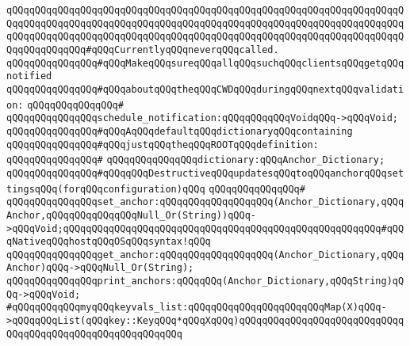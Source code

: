 \verb|qQQqqQQqqQQqqQQqqQQqqQQqqQQqqQQqqQQqqQQqqQQqqQQqqQQqqQQqqQQqqQQqqQQqqQQqqQQqqQQqqQQqqQQqqQQqqQQqqQQqqQQqqQQqqQQqqQQqqQQqqQQqqQQqqQQqqQQqqQQqqQQqqQQqqQQqqQQqqQQqqQQqqQQqqQQqqQQqqQQqqQQqqQQqqQQqqQQqqQQqqQQqqQQqqQQqqQQqqQQqqQQq#qQQqCurrentlyqQQqneverqQQqcalled.|\newline
\newline
\verb|qQQqqQQqqQQqqQQq#qQQqMakeqQQqsureqQQqallqQQqsuchqQQqclientsqQQqgetqQQqnotified|\newline
\verb|qQQqqQQqqQQqqQQq#qQQqaboutqQQqtheqQQqCWDqQQqduringqQQqnextqQQqvalidation:|\newline
\verb|qQQqqQQqqQQqqQQq#|\newline
\verb|qQQqqQQqqQQqqQQqschedule_notification:qQQqqQQqqQQqVoidqQQq->qQQqVoid;|\newline
\newline
\newline
\verb|qQQqqQQqqQQqqQQq#qQQqAqQQqdefaultqQQqdictionaryqQQqcontaining|\newline
\verb|qQQqqQQqqQQqqQQq#qQQqjustqQQqtheqQQqROOTqQQqdefinition:|\newline
\verb|qQQqqQQqqQQqqQQq#|\newline
\verb|qQQqqQQqqQQqqQQqdictionary:qQQqAnchor_Dictionary;|\newline
\newline
\newline
\verb|qQQqqQQqqQQqqQQq#qQQqqQQqDestructiveqQQqupdatesqQQqtoqQQqanchorqQQqsettingsqQQq(forqQQqconfiguration)qQQq|\newline
\verb|qQQqqQQqqQQqqQQq#|\newline
\verb|qQQqqQQqqQQqqQQqset_anchor:qQQqqQQqqQQqqQQqqQQq(Anchor_Dictionary,qQQqAnchor,qQQqqQQqqQQqqQQqNull_Or(String))qQQq->qQQqVoid;qQQqqQQqqQQqqQQqqQQqqQQqqQQqqQQqqQQqqQQqqQQqqQQqqQQqqQQq#qQQqNativeqQQqhostqQQqOSqQQqsyntax!qQQq|\newline
\verb|qQQqqQQqqQQqqQQqget_anchor:qQQqqQQqqQQqqQQqqQQq(Anchor_Dictionary,qQQqAnchor)qQQq->qQQqNull_Or(String);|\newline
\newline
\verb|qQQqqQQqqQQqqQQqprint_anchors:qQQqqQQq(Anchor_Dictionary,qQQqString)qQQq->qQQqVoid;|\newline
\newline
\verb|#qQQqqQQqqQQqmyqQQqkeyvals_list:qQQqqQQqqQQqqQQqqQQqqQQqMap(X)qQQq->qQQqqQQqList(qQQqkey::KeyqQQq*qQQqXqQQq)qQQqqQQqqQQqqQQqqQQqqQQqqQQqqQQqqQQqqQQqqQQqqQQqqQQqqQQqqQQq|\newline

